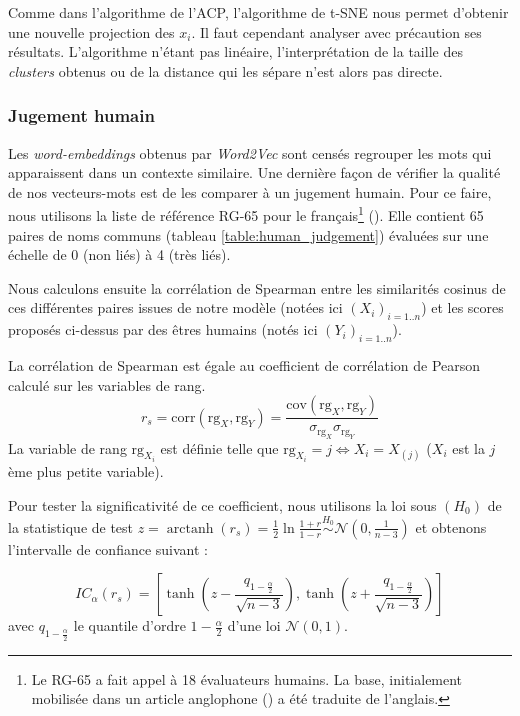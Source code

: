 \documentclass[11pt,french,french]{article}
\let\rmarkdownfootnote\footnote%
\def\footnote{\protect\rmarkdownfootnote}
\DeclareMathOperator{\arctanh}{arctanh}
\begin{document}
Comme dans l'algorithme de l'ACP, l'algorithme de t-SNE nous permet d'obtenir une nouvelle projection des \(x_i\).
Il faut cependant analyser avec précaution ses résultats. L'algorithme n'étant pas linéaire, l'interprétation de la taille des \emph{clusters} obtenus ou de la distance qui les sépare n'est alors pas directe.

\hypertarget{sec:jugementHumain}{%
\subsubsection{Jugement humain}\label{sec:jugementHumain}}

Les \emph{word-embeddings} obtenus par \emph{Word2Vec} sont censés regrouper les mots qui apparaissent dans un contexte similaire.
Une dernière façon de vérifier la qualité de nos vecteurs-mots est de les comparer à un jugement humain. Pour ce faire, nous utilisons la liste de référence RG-65 pour le français\footnote{Le RG-65 a fait appel à 18 évaluateurs humains. La base, initialement mobilisée dans un article anglophone (\cite{Rubenstein}) a été traduite de l'anglais.} (\cite{Boumedyen}).
Elle contient 65 paires de noms communs (tableau \ref{table:human_judgement}) évaluées sur une échelle de 0 (non liés) à 4 (très liés).

Nous calculons ensuite la corrélation de Spearman entre les similarités cosinus de ces différentes paires issues de notre modèle (notées ici \((X_i)_{i=1..n}\)) et les scores proposés ci-dessus par des êtres humains (notés ici \((Y_i)_{i=1..n}\)).

La corrélation de Spearman est égale au coefficient de corrélation de Pearson calculé sur les variables de rang.
\[
r_s = \mathrm{corr}(\mathrm{rg}_X, \mathrm{rg}_Y) = 
\frac{\mathrm{cov}(\mathrm{rg}_X, \mathrm{rg}_Y)}{
\sigma_{\mathrm{rg}_X} \sigma_{\mathrm{rg}_Y}
}
\]
La variable de rang \(\mathrm{rg}_{X_i}\) est définie telle que \(\mathrm{rg}_{X_i}=j \iff X_i = X_{(j)}\) (\(X_i\) est la \(j\)ème plus petite variable).

Pour tester la significativité de ce coefficient, nous utilisons la loi sous \((H_0)\) de la statistique de test \(z = \arctanh(r_s) = \frac{1}{2} \ln\frac{1+r}{1-r} \overset{H_0}{\sim}\mathcal{N}(0, \frac{1}{n-3})\) et obtenons l'intervalle de confiance suivant :

\[
IC_\alpha (r_s) = \left[\tanh\left(z-\frac{q_{1-\frac{\alpha}{2}}}{\sqrt{n-3}}\right),
\tanh\left(z+\frac{q_{1-\frac{\alpha}{2}}}{\sqrt{n-3}}\right)\right]
\]
avec \(q_{1-\frac{\alpha}{2}}\) le quantile d'ordre \(1-\frac{\alpha}{2}\) d'une loi \(\mathcal{N}(0, 1)\).
\end{document}
